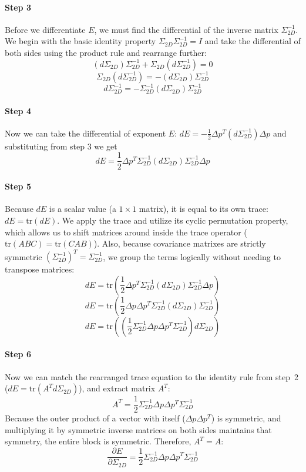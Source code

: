 \paragraph{Step 3} Before we differentiate $E$, we must find the differential of the inverse matrix $\Sigma_{2D}^{-1}$. We begin with the basic identity property $\Sigma_{2D} \Sigma_{2D}^{-1} = I$ and take the differential of both sides using the product rule and rearrange further:
$$(d\Sigma_{2D}) \Sigma_{2D}^{-1} + \Sigma_{2D} (d\Sigma_{2D}^{-1}) = 0$$
$$\Sigma_{2D} (d\Sigma_{2D}^{-1}) = -(d\Sigma_{2D}) \Sigma_{2D}^{-1}$$
$$d\Sigma_{2D}^{-1} = -\Sigma_{2D}^{-1} (d\Sigma_{2D}) \Sigma_{2D}^{-1}$$

\paragraph{Step 4} Now we can take the differential of exponent $E$: $dE = -\frac{1}{2} \Delta p^T (d\Sigma_{2D}^{-1}) \Delta p$ and substituting from step 3 we get $$dE = \frac{1}{2} \Delta p^T \Sigma_{2D}^{-1} (d\Sigma_{2D}) \Sigma_{2D}^{-1} \Delta p$$

\paragraph{Step 5} Because $dE$ is a scalar value (a $1\times 1$ matrix), it is equal to its own trace: $dE = \text{tr}(dE)$. We apply the trace and utilize its cyclic permutation property, which allows us to shift matrices around inside the trace operator ($\text{tr}(ABC) = \text{tr}(CAB)$). Also, because covariance matrixes are strictly symmetric $(\Sigma_{2D}^{-1})^T = \Sigma_{2D}^{-1}$, we group the terms logically without needing to transpose matrices:
$$dE = \text{tr}\left( \frac{1}{2} \Delta p^T \Sigma_{2D}^{-1} (d\Sigma_{2D}) \Sigma_{2D}^{-1} \Delta p \right)$$
$$dE = \text{tr}\left( \frac{1}{2} \Delta p \Delta p^T \Sigma_{2D}^{-1} (d\Sigma_{2D}) \Sigma_{2D}^{-1} \right)$$
$$dE = \text{tr}\left( \left( \frac{1}{2} \Sigma_{2D}^{-1} \Delta p \Delta p^T \Sigma_{2D}^{-1} \right) d\Sigma_{2D} \right)$$

\paragraph{Step 6} Now we can match the rearranged trace equation to the identity rule from step~2 ($dE = \text{tr}(A^T d\Sigma_{2D})$), and extract matrix $A^T$:
$$A^T = \frac{1}{2} \Sigma_{2D}^{-1} \Delta p \Delta p^T \Sigma_{2D}^{-1}$$
Because the outer product of a vector with itself ($\Delta p \Delta p^T$) is symmetric, and multiplying it by symmetric inverse matrices on both sides maintains that symmetry, the entire block is symmetric. Therefore, $A^T = A$:
$$\frac{\partial E}{\partial \Sigma_{2D}} = \frac{1}{2} \Sigma_{2D}^{-1} \Delta p \Delta p^T \Sigma_{2D}^{-1}$$

